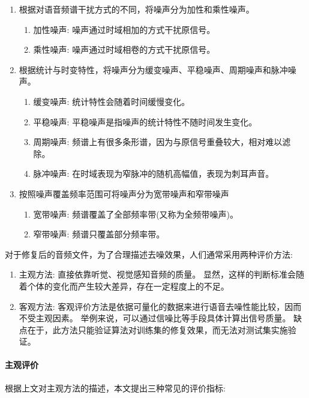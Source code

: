 \documentclass{morningstar}
\begin{document}
\begin{enumerate}
\item 根据对语音频谱干扰方式的不同，将噪声分为加性和乘性噪声。
    \begin{enumerate}
        \item 加性噪声: 噪声通过时域相加的方式干扰原信号。
        \item 乘性噪声: 噪声通过时域相卷的方式干扰原信号。
    \end{enumerate}

\item 根据统计与时变特性，将噪声分为缓变噪声、平稳噪声、周期噪声和脉冲噪声。
    \begin{enumerate}
        \item 缓变噪声: 统计特性会随着时间缓慢变化。
        \item 平稳噪声: 平稳噪声是指噪声的统计特性不随时间发生变化。
        \item 周期噪声: 频谱上有很多条形谱，因为与原信号重叠较大，相对难以滤除。
        \item 脉冲噪声: 在时域表现为窄脉冲的随机高幅值，表现为刺耳声音。
    \end{enumerate}

\item 按照噪声覆盖频率范围可将噪声分为宽带噪声和窄带噪声
    \begin{enumerate}
        \item 宽带噪声: 频谱覆盖了全部频率带(又称为全频带噪声)。
        \item 窄带噪声: 频谱只覆盖部分频率带。
    \end{enumerate}

\end{enumerate}

\clearpage
{}

对于修复后的音频文件，为了合理描述去噪效果，人们通常采用两种评价方法: 
\begin{enumerate}
\item 主观方法: 直接依靠听觉、视觉感知音频的质量。
显然，这样的判断标准会随着个体的变化而产生较大差异，存在一定程度上的不足。

\item 客观方法: 客观评价方法是依据可量化的数据来进行语音去噪性能比较，因而不受主观因素。
举例来说，可以通过信噪比等手段具体计算出信号质量。
缺点在于，此方法只能验证算法对训练集的修复效果，而无法对测试集实施验证。
\end{enumerate}


\paragraph{主观评价}
根据上文对主观方法的描述，本文提出三种常见的评价指标: 
\end{document}
